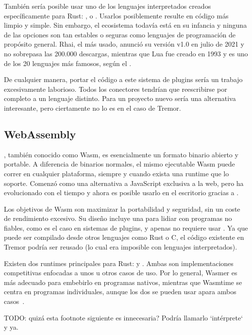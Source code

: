 También sería posible usar uno de los lenguajes interpretados creados
específicamente para Rust: \textcite{cratesiogluon}, \textcite{cratesiorhai} o
\textcite{cratesiorune}. Usarlos posiblemente resulte en código más limpio y
simple. Sin embargo, el ecosistema todavía está en su infancia y ninguna de las
opciones son tan estables o seguras como lenguajes de programación de propósito
general. Rhai, el más usado, anunció su versión v1.0 en julio de 2021 y no
sobrepasa las 200.000 descargas, mientras que Lua fue creado en 1993 y es uno de
los 20 lenguajes más famosos, según el \textcite{tiobe}.

De cualquier manera, portar el código a este sistema de plugins sería un trabajo
excesivamente laborioso. Todos los conectores tendrían que reescribirse por
completo a un lenguaje distinto. Para un proyecto nuevo sería una alternativa
interesante, pero ciertamente no lo es en el caso de Tremor.

\subsection{WebAssembly}

\textcite{wasm}, también conocido como Wasm, es esencialmente un formato binario
abierto y portable. A diferencia de binarios normales, el mismo ejecutable Wasm
puede correr en cualquier plataforma, siempre y cuando exista una runtime que lo
soporte. Comenzó como una alternativa a JavaScript exclusiva a la web, pero ha
evolucionado con el tiempo y ahora es posible usarlo en el escritorio gracias a
\textcite{wasi}.

Los objetivos de Wasm son maximizar la portabilidad y seguridad, sin un coste de
rendimiento excesivo. Su diseño incluye una \sandbox para lidiar con programas
no fiables, como es el caso en sistemas de plugins, y apenas no requiere usar
\unsafe. Ya que puede ser compilado desde otros lenguajes como Rust o C, el
código existente en Tremor podría ser reusado (lo cual era imposible con
lenguajes interpretados).

Existen dos runtimes principales para Rust: \textcite{wasmer} y
\textcite{wasmtime}. Ambas son implementaciones competitivas enfocadas a unos u
otros casos de uso. Por lo general, Wasmer es más adecuado para embebirlo en
programas nativos, mientras que Wasmtime se centra en programas individuales,
aunque los dos se pueden usar apara ambos casos~\cite{wasmwikiusage}.

TODO: quizá esta footnote siguiente es innecesaria? Podría llamarlo `intérprete`
y ya.

